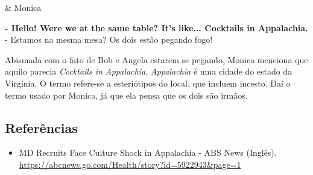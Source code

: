 \begin{tcolorbox}[enhanced,center upper,
    drop fuzzy shadow southeast, boxrule=0.3pt,
    lower separated=false,
    colframe=black!30!dialogoBorder,colback=white]
\begin{minipage}[c]{0.16\linewidth}
   & \centering \scriptsize{Monica}
\end{minipage}
\hfill
\begin{minipage}[c]{0.8\linewidth}
  \textbf{- Hello! Were we at the same table? It's like... Cocktails in Appalachia.}\\
  - Estamos na mesma mesa? Os dois estão pegando fogo!
\end{minipage}
\end{tcolorbox}

Abismada com o fato de Bob e Angela estarem se pegando, Monica menciona
que aquilo parecia \emph{Cocktails in Appalachia}. \emph{Appalachia} é
uma cidade do estado da Virgínia. O termo refere-se a esteriótipos do
local, que incluem incesto. Daí o termo usado por Monica, já que ela
pensa que os dois são irmãos.

\hypertarget{referuxeancias-2}{%
\subsection{Referências}\label{referuxeancias-2}}

\begin{itemize}
\tightlist
\item
  \sloppy MD Recruits Face Culture Shock in Appalachia - ABS News (Inglês). \url{https://abcnews.go.com/Health/story?id=5922943&page=1}
\end{itemize}
